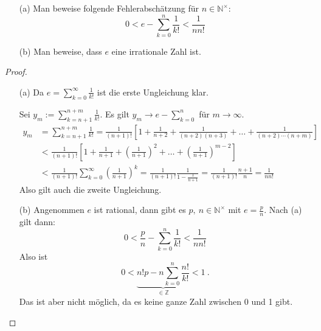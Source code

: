 \setcounter{aufgabe}{6}
\begin{aufgabe}
\begin{enumerate}
\item[(a)] Man beweise folgende Fehlerabschätzung für $n \in \mathbb N^\times$:
\[
0 < e - \sum_{k=0}^n \frac{1}{k!} < \frac{1}{n n!}
\]
\item[(b)] Man beweise, dass $e$ eine irrationale Zahl ist.
\end{enumerate}
\end{aufgabe}
\begin{proof}
\begin{enumerate}
\item[(a)] Da $e = \sum_{k=0}^\infty \frac{1}{k!}$ ist die erste Ungleichung klar.

Sei $y_m := \sum_{k = n+1}^{n + m} \frac{1}{k!}$. Es gilt 
$y_m \to e - \sum_{k=0}^n$ für $m \to \infty$.
\begin{align*}
y_m &= \sum_{k=n+1}^{n+m} \frac{1}{k!}
	= \frac{1}{(n+1)!} \left[ 1 + \frac{1}{n+2} + \frac{1}{(n+2)(n+3)} + \ldots
	+ \frac{1}{(n+2) \cdots (n+m)} \right] \\
	&< \frac{1}{(n+1)!} \left[ 1 + \frac{1}{n+1} + \left( \frac{1}{n+1} \right)^2 + \ldots
	+ \left( \frac{1}{n+1} \right)^{m-2} \right] \\
	&< \frac{1}{(n+1)!} \sum_{k=0}^\infty \left( \frac{1}{n+1} \right)^k
	= \frac{1}{(n+1)!} \frac{1}{1 - \frac{1}{n+1}} 
	= \frac{1}{(n+1)!} \frac{n+1}{n} = \frac{1}{n n!}
\end{align*}
Also gilt auch die zweite Ungleichung.

\item[(b)] Angenommen $e$ ist rational, dann gibt es $p, \ n \in \mathbb N^\times$
mit $e = \frac p n$. Nach (a) gilt dann:
\[
0 < \frac p n - \sum_{k=0}^n \frac{1}{k!} < \frac{1}{n n!}
\]
Also ist
\[
0 < \underbrace{ n! p - n \sum_{k=0}^n \frac{n!}{k!} }_{\in \mathbb Z} < 1 \ .
\]
Das ist aber nicht möglich, da es keine ganze Zahl zwischen 0 und 1 gibt.
\end{enumerate}
\end{proof}

